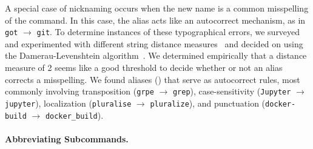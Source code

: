 \documentclass[sigconf,nonacm,screen]{acmart}
\newcommand{\num}[1]{\numprint{#1}}
\newcommand{\per}[1]{\numprint[\%]{#1}}
\newcommand{\alias}[2]{{\texttt{#1} $\rightarrow$ \texttt{#2}}}
\begin{document}
A special case of nicknaming occurs when the new name is a common misspelling of the command.
In this case, the alias acts like an autocorrect mechanism, as in \alias{got}{git}.
To determine instances of these typographical errors, we surveyed and experimented with different string distance measures~\citep{navarro:01} and decided on using the Damerau-Levenshtein algorithm~\citep{damerau:64}.
We determined empirically that a distance measure of 2 seems like a good threshold to decide whether or not an alias corrects a misspelling.
We found \num{9195} aliases (\per{0.42}) that serve as autocorrect rules, most commonly involving transposition (\alias{grpe}{grep}), case-sensitivity (\alias{Jupyter}{jupyter}), localization (\alias{pluralise}{pluralize}), and punctuation (\alias{docker-build}{docker\_build}).


\paragraph{\bf Abbreviating Subcommands.}
\end{document}
